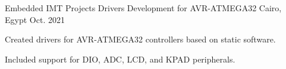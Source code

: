 \begin{cventries}
\cventry
{\normalsize Embedded IMT Projects} %
{\Large Drivers Development for AVR-ATMEGA32} %
{\normalsize Cairo, Egypt} %
{\normalsize Oct. 2021} %
{
  \begin{cvitems} %
    \item {\normalsize Created drivers for AVR-ATMEGA32 controllers based on static software.}
    \item {\normalsize Included support for DIO, ADC, LCD, and KPAD peripherals.}
  \end{cvitems}
}


\end{cventries}
